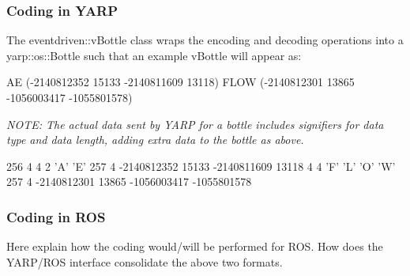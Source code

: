 \subsubsection*{Coding in Y\+A\+RP }

The eventdriven\+::v\+Bottle class wraps the encoding and decoding operations into a yarp\+::os\+::\+Bottle such that an example v\+Bottle will appear as\+: \begin{DoxyVerb}AE (-2140812352 15133 -2140811609 13118) FLOW (-2140812301 13865 -1056003417 -1055801578)
\end{DoxyVerb}


{\itshape N\+O\+TE\+: The actual data sent by Y\+A\+RP for a bottle includes signifiers for data type and data length, adding extra data to the bottle as above.} \begin{DoxyVerb}256 4 4 2 'A' 'E' 257 4 -2140812352 15133 -2140811609 13118 4 4 'F' 'L' 'O' 'W' 257 4 -2140812301 13865 -1056003417 -1055801578
\end{DoxyVerb}


\subsubsection*{Coding in R\+OS }

Here explain how the coding would/will be performed for R\+OS. How does the Y\+A\+R\+P/\+R\+OS interface consolidate the above two formats. 